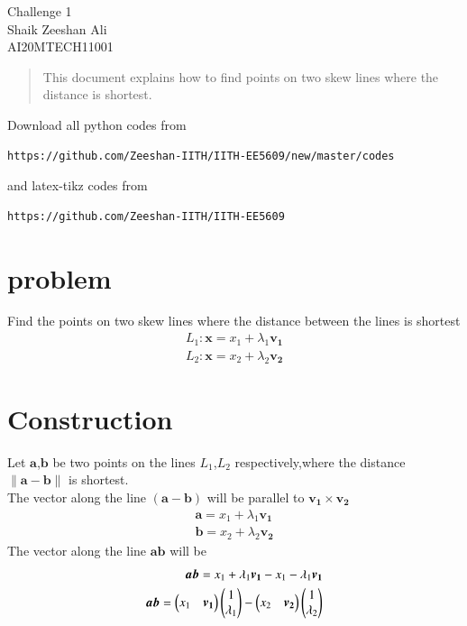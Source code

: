 \documentclass[journal,12pt,twocolumn]{IEEEtran}
\newcommand{\norm}[1]{\| #1 \|}
\begin{document}
\begin{center}
\huge Challenge 1\\

\large Shaik Zeeshan Ali\\
\large AI20MTECH11001\\
\end{center}
\vspace{0.5cm}
\begin{abstract}
This document explains how to find points on two skew lines where the distance is shortest.
\end{abstract}
\vspace{0.5cm}
Download all python codes from 
\begin{lstlisting}
https://github.com/Zeeshan-IITH/IITH-EE5609/new/master/codes
\end{lstlisting}
%
and latex-tikz codes from 
\begin{lstlisting}
https://github.com/Zeeshan-IITH/IITH-EE5609
\end{lstlisting}
%
\section{problem}
Find the points on two skew lines where the distance between the lines is shortest\\
\begin{align}
    L_1\colon \bm{x}= x_1+\lambda_1\bm{v_1}\\
    L_2\colon \bm{x}= x_2+\lambda_2\bm{v_2}
\end{align}
\section{Construction}
Let $\bm{a}$,$\bm{b}$ be two points on the lines $L_1$,$L_2$ respectively,where the distance $\norm{\bm{a}-\bm{b}}$ is shortest.\\
The vector along the line $(\bm{a}-\bm{b})$ will be parallel to $\bm{v_1}\times\bm{v_2}$\\
\begin{align}
    \bm{a}=x_1+\lambda_1\bm{v_1}\\
    \bm{b}=x_2+\lambda_2\bm{v_2}
\end{align}
The vector along the line $\bm{ab}$ will be \\
\begin{align}
    \bm{ab}=x_1+\lambda_1\bm{v_1}-x_1-\lambda_1\bm{v_1}\notag\\
    \bm{ab}=\begin{pmatrix}x_1 & \bm{v_1}\end{pmatrix}\begin{pmatrix}1 \\ \lambda_1\end{pmatrix}-\begin{pmatrix}x_2 & \bm{v_2}\end{pmatrix}\begin{pmatrix}1 \\ \lambda_2\end{pmatrix}
\end{align}
\end{document}
